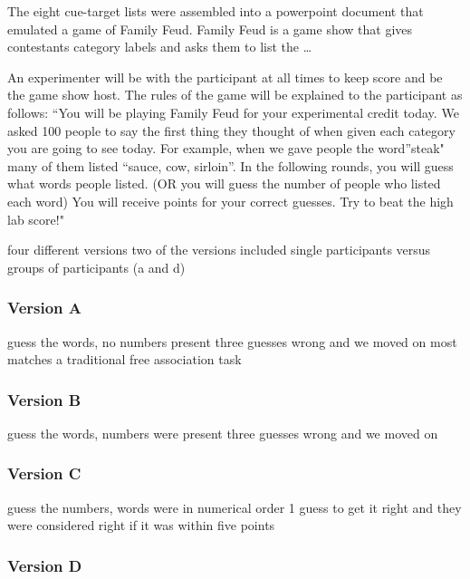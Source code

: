 \documentclass[man]{apa6}
\begin{document}
The eight cue-target lists were assembled into a powerpoint document that emulated a game of Family Feud. Family Feud is a game show that gives contestants category labels and asks them to list the \ldots{}

An experimenter will be with the participant at all times to keep score and be the game show host. The rules of the game will be explained to the participant as follows: \enquote{You will be playing Family Feud for your experimental credit today. We asked 100 people to say the first thing they thought of when given each category you are going to see today. For example, when we gave people the word}steak" many of them listed \enquote{sauce, cow, sirloin}. In the following rounds, you will guess what words people listed. (OR you will guess the number of people who listed each word) You will receive points for your correct guesses. Try to beat the high lab score!"

four different versions
two of the versions included single participants versus groups of participants (a and d)

\hypertarget{version-a}{%
\subsubsection{Version A}\label{version-a}}

guess the words, no numbers present
three guesses wrong and we moved on
most matches a traditional free association task

\hypertarget{version-b}{%
\subsubsection{Version B}\label{version-b}}

guess the words, numbers were present
three guesses wrong and we moved on

\hypertarget{version-c}{%
\subsubsection{Version C}\label{version-c}}

guess the numbers, words were in numerical order
1 guess to get it right and they were considered right if it was within five points

\hypertarget{version-d}{%
\subsubsection{Version D}\label{version-d}}
\end{document}
